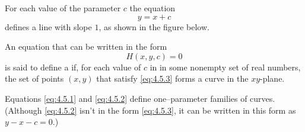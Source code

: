 \documentclass{ximera}
\begin{document}
 
 
\begin{example} \label{example:4.5.2}
For each value of the parameter $c$ the equation
\begin{equation} \label{eq:4.5.2}
y=x+c
\end{equation}
 defines a line with slope $1$, as shown in the figure below.

\begin{center}
\end{center}
  
\end{example}
 
 
 
 
 
\begin{definition}\label{thmtype:4.5.1}
An equation that can be written in the form
 \begin{equation} \label{eq:4.5.3}
H(x,y,c)=0
\end{equation}
is said to define a  if, for
each value of $c$ in in some nonempty set of real numbers, the set of
points $(x,y)$ that satisfy  \eqref{eq:4.5.3} forms a curve in the
$xy$-plane.
\end{definition}
 
Equations \eqref{eq:4.5.1} and \eqref{eq:4.5.2} define one--parameter families
of curves. (Although \eqref{eq:4.5.2} isn't  in the form \eqref{eq:4.5.3}, it
can be written in this form as $y-x-c=0$.)
 
\end{document}
